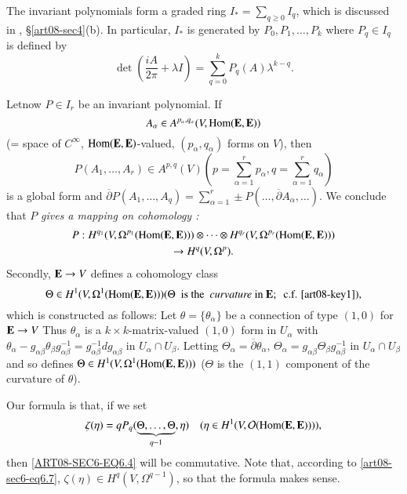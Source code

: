 The invariant polynomials form a graded ring $I_{*}=\sum\limits_{q\geq 0}I_{q}$, which is discussed in \cite{art08-key11}, \S\ref{art08-sec4}(b). In particular, $I_{*}$ is generated by $P_{0},P_{1},\ldots,P_{k}$ where $P_{q}\in I_{q}$ is defined by
\begin{equation}
\det\left(\dfrac{iA}{2\pi}+\lambda I\right)=\sum\limits^{k}_{q=0}P_{q}(A)\lambda^{k-q}.\label{art08-sec6-eq6.6}
\end{equation}

Let\pageoriginale now $P\in I_{r}$ be an invariant polynomial. If
$$
A_{\alpha}\in A^{p_{\alpha},q_{\alpha}}(V,\operatorname{\mathrm{Hom}}(\mathbf{E},\mathbf{E}))
$$
(= space of $C^{\infty}$, $\operatorname{\mathrm{Hom}}(\mathbf{E},\mathbf{E})$-valued, $(p_{\alpha},q_{\alpha})$ forms on $V$), then 
$$
P(A_{1},\ldots,A_{r})\in A^{p,q}(V)\left(p=\sum\limits^{r}_{\alpha=1}p_{\alpha},q=\sum\limits^{r}_{\alpha=1}q_{\alpha}\right)
$$ 
is a global form and $\overline{\partial}P(A_{1},\ldots,A_{q})=\sum\limits^{r}_{\alpha=1}\pm P(\ldots,\overline{\partial}A_{\alpha},\ldots)$. We conclude that $P$ {\em gives a mapping on cohomology :}
\begin{gather}
P : H^{q_{1}}(V,\Omega^{p_{1}}(\operatorname{\mathrm{Hom}}(\mathbf{E},\mathbf{E})))\otimes\cdots\otimes H^{q_{r}}(V,\Omega^{p_{r}}(\operatorname{\mathrm{Hom}}(\mathbf{E},\mathbf{E})))\notag\\
\to H^{q}(V,\Omega^{p}).\label{art08-sec6-eq6.7}
\end{gather}
Secondly, $\mathbf{E}\to V$ defines a cohomology class
$$
\Theta\in H^{1}(V,\Omega^{1}(\operatorname{\mathrm{Hom}}(\mathbf{E},\mathbf{E}))) (\Theta \text{~ is the~ {\em curvature} in } \mathbf{E};\text{~ c.f. \cite{art08-key1}}),
$$
which is constructed as follows: Let $\theta=\{\theta_{\alpha}\}$ be a connection of type $(1,0)$ for $\mathbf{E}\to V$ Thus $\theta_{\alpha}$ is a $k\times k$-matrix-valued $(1,0)$ form in $U_{\alpha}$ with $\theta_{\alpha}-g_{\alpha\beta}\theta_{\beta}g^{-1}_{\alpha\beta}=g^{-1}_{\alpha\beta}dg_{\alpha\beta}$ in $U_{\alpha}\cap U_{\beta}$. Letting $\Theta_{\alpha}=\overline{\partial}\theta_{\alpha}$, $\Theta_{\alpha}=g_{\alpha\beta}\Theta_{\beta}g^{-1}_{\alpha\beta}$ in $U_{\alpha}\cap U_{\beta}$ and so defines $\Theta\in H^{1}(V,\Omega^{1}(\operatorname{\mathrm{Hom}}(\mathbf{E},\mathbf{E})))$ ($\Theta$ is the $(1,1)$ component of the curvature of $\theta$).

Our formula is that, if we set
\begin{equation}
\zeta(\eta)=qP_{q}(\underbrace{\Theta,\ldots,\Theta}_{q-1},\eta)\quad (\eta\in H^{1}(V,\mathcal{O}(\operatorname{\mathrm{Hom}}(\mathbf{E},\mathbf{E})))),\label{ART08-SEC6-EQ6.8}
\end{equation}
then \eqref{ART08-SEC6-EQ6.4} will be commutative. Note that, according to \eqref{art08-sec6-eq6.7}, $\zeta(\eta)\in H^{q}(V,\Omega^{q-1})$, so that the formula makes sense.

